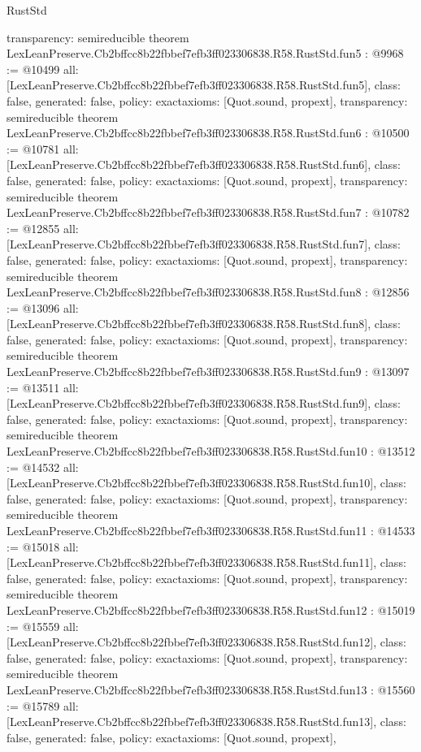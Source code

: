 \begin{lexlean}{RustStd}
\begin{coremodule}
{  transparency: semireducible
}
theorem LexLeanPreserve.Cb2bffcc8b22fbbef7efb3ff023306838.R58.RustStd.fun5 : @9968 := @10499 {
  all: [LexLeanPreserve.Cb2bffcc8b22fbbef7efb3ff023306838.R58.RustStd.fun5],
  class: false,
  generated: false,
  policy: exact{axioms: [Quot.sound, propext]},
  transparency: semireducible
}
theorem LexLeanPreserve.Cb2bffcc8b22fbbef7efb3ff023306838.R58.RustStd.fun6 : @10500 := @10781 {
  all: [LexLeanPreserve.Cb2bffcc8b22fbbef7efb3ff023306838.R58.RustStd.fun6],
  class: false,
  generated: false,
  policy: exact{axioms: [Quot.sound, propext]},
  transparency: semireducible
}
theorem LexLeanPreserve.Cb2bffcc8b22fbbef7efb3ff023306838.R58.RustStd.fun7 : @10782 := @12855 {
  all: [LexLeanPreserve.Cb2bffcc8b22fbbef7efb3ff023306838.R58.RustStd.fun7],
  class: false,
  generated: false,
  policy: exact{axioms: [Quot.sound, propext]},
  transparency: semireducible
}
theorem LexLeanPreserve.Cb2bffcc8b22fbbef7efb3ff023306838.R58.RustStd.fun8 : @12856 := @13096 {
  all: [LexLeanPreserve.Cb2bffcc8b22fbbef7efb3ff023306838.R58.RustStd.fun8],
  class: false,
  generated: false,
  policy: exact{axioms: [Quot.sound, propext]},
  transparency: semireducible
}
theorem LexLeanPreserve.Cb2bffcc8b22fbbef7efb3ff023306838.R58.RustStd.fun9 : @13097 := @13511 {
  all: [LexLeanPreserve.Cb2bffcc8b22fbbef7efb3ff023306838.R58.RustStd.fun9],
  class: false,
  generated: false,
  policy: exact{axioms: [Quot.sound, propext]},
  transparency: semireducible
}
theorem LexLeanPreserve.Cb2bffcc8b22fbbef7efb3ff023306838.R58.RustStd.fun10 : @13512 := @14532 {
  all: [LexLeanPreserve.Cb2bffcc8b22fbbef7efb3ff023306838.R58.RustStd.fun10],
  class: false,
  generated: false,
  policy: exact{axioms: [Quot.sound, propext]},
  transparency: semireducible
}
theorem LexLeanPreserve.Cb2bffcc8b22fbbef7efb3ff023306838.R58.RustStd.fun11 : @14533 := @15018 {
  all: [LexLeanPreserve.Cb2bffcc8b22fbbef7efb3ff023306838.R58.RustStd.fun11],
  class: false,
  generated: false,
  policy: exact{axioms: [Quot.sound, propext]},
  transparency: semireducible
}
theorem LexLeanPreserve.Cb2bffcc8b22fbbef7efb3ff023306838.R58.RustStd.fun12 : @15019 := @15559 {
  all: [LexLeanPreserve.Cb2bffcc8b22fbbef7efb3ff023306838.R58.RustStd.fun12],
  class: false,
  generated: false,
  policy: exact{axioms: [Quot.sound, propext]},
  transparency: semireducible
}
theorem LexLeanPreserve.Cb2bffcc8b22fbbef7efb3ff023306838.R58.RustStd.fun13 : @15560 := @15789 {
  all: [LexLeanPreserve.Cb2bffcc8b22fbbef7efb3ff023306838.R58.RustStd.fun13],
  class: false,
  generated: false,
  policy: exact{axioms: [Quot.sound, propext]},
}
\end{coremodule}
\end{lexlean}
